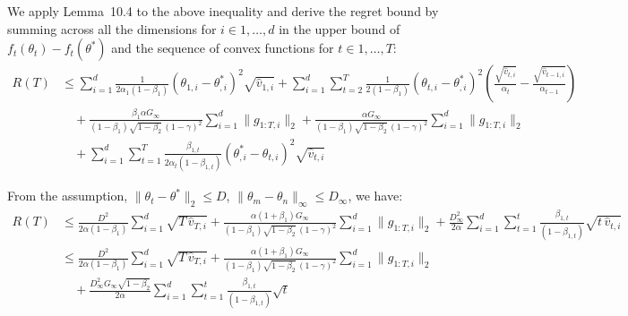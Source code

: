 \documentclass[11pt]{article}
\begin{document}
\noindent
We apply Lemma~10.4 to the above inequality and derive the regret
bound by summing across all the dimensions for $i \in 1, \ldots, d$
in the upper bound of $f_t(\theta_t) - f_t(\theta^*)$ and the
sequence of convex functions for $t \in 1, \ldots, T$:
\begin{align*}
R(T)
 &\leq \sum_{i=1}^{d} \frac{1}{2\alpha_1(1 - \beta_1)}
       (\theta_{1,i} - \theta^*_{,i})^2 \sqrt{\widehat{v}_{1,i}}
     + \sum_{i=1}^{d} \sum_{t=2}^{T} \frac{1}{2(1 - \beta_1)}
       (\theta_{t,i} - \theta^*_{,i})^2
       \left(\frac{\sqrt{\widehat{v}_{t,i}}}{\alpha_t} - \frac{\sqrt{\widehat{v}_{t-1,i}}}{\alpha_{t-1}}\right) \\
 &\quad + \frac{\beta_1 \alpha G_\infty}{(1 - \beta_1)\sqrt{1 - \beta_2}\,(1 - \gamma)^2}
          \sum_{i=1}^{d} \|g_{1:T,i}\|_2
        + \frac{\alpha G_\infty}{(1 - \beta_1)\sqrt{1 - \beta_2}\,(1 - \gamma)^2}
          \sum_{i=1}^{d} \|g_{1:T,i}\|_2 \\
 &\quad + \sum_{i=1}^{d} \sum_{t=1}^{T} \frac{\beta_{1,t}}{2\alpha_t(1 - \beta_{1,t})}
          (\theta^*_{,i} - \theta_{t,i})^2 \sqrt{\widehat{v}_{t,i}}
\end{align*}


\newpage

\setcounter{equation}{12}

\noindent
From the assumption, $\|\theta_t - \theta^*\|_2 \leq D$,
$\|\theta_m - \theta_n\|_\infty \leq D_\infty$, we have:
\begin{align*}
R(T)
 &\leq \frac{D^2}{2\alpha(1 - \beta_1)}
       \sum_{i=1}^{d} \sqrt{T\,\widehat{v}_{T,i}}
     + \frac{\alpha(1 + \beta_1) G_\infty}
            {(1 - \beta_1)\sqrt{1 - \beta_2}\,(1 - \gamma)^2}
       \sum_{i=1}^{d} \|g_{1:T,i}\|_2
     + \frac{D_\infty^2}{2\alpha}
       \sum_{i=1}^{d} \sum_{t=1}^{t}
       \frac{\beta_{1,t}}{(1 - \beta_{1,t})}
       \sqrt{t\,\widehat{v}_{t,i}} \\[0.4em]
 &\leq \frac{D^2}{2\alpha(1 - \beta_1)}
       \sum_{i=1}^{d} \sqrt{T\,\widehat{v}_{T,i}}
     + \frac{\alpha(1 + \beta_1) G_\infty}
            {(1 - \beta_1)\sqrt{1 - \beta_2}\,(1 - \gamma)^2}
       \sum_{i=1}^{d} \|g_{1:T,i}\|_2 \\[0.2em]
 &\quad + \frac{D_\infty^2 G_\infty \sqrt{1 - \beta_2}}{2\alpha}
         \sum_{i=1}^{d} \sum_{t=1}^{t}
         \frac{\beta_{1,t}}{(1 - \beta_{1,t})} \sqrt{t}
\end{align*}
\end{document}
